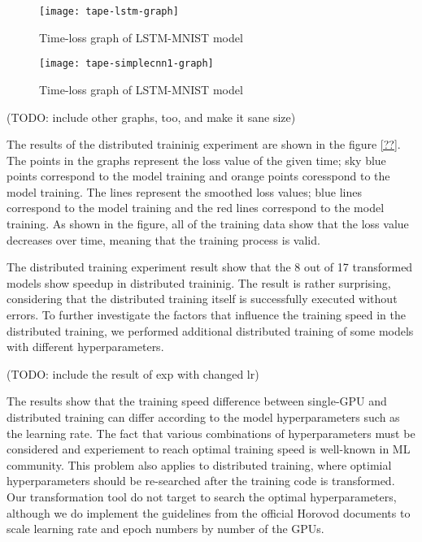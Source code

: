 \begin{figure}[!ht]
  \texttt{[image: tape-lstm-graph]}
  \caption{Time-loss graph of LSTM-MNIST model}
\end{figure}

\begin{figure}[!ht]
  \texttt{[image: tape-simplecnn1-graph]}
  \caption{Time-loss graph of LSTM-MNIST model}
\end{figure}

(TODO: include other graphs, too, and make it sane size)

The results of the distributed traininig experiment 
are shown in the figure \ref{??}.
The points in the graphs represent the loss value of the given time;
sky blue points correspond to the \orgbf model training and
orange points coresspond to the \hvdbf model training.
The lines represent the smoothed loss values;
blue lines correspond to the \orgbf model training
and the red lines correspond to the \hvdbf model training.
As shown in the figure, all of the training data show that
the loss value decreases over time, meaning that the training
process is valid.

The distributed training experiment result show that the 8 out of 17 transformed
models show speedup in distributed traininig. The result is rather surprising,
considering that the distributed training itself is successfully executed
without errors. To further investigate the factors that influence the
training speed in the distributed training, 
we performed additional distributed training of some models with
different hyperparameters.

(TODO: include the result of exp with changed lr)

The results show that the training speed difference between single-GPU and
distributed training can differ according to the model hyperparameters
such as the learning rate. The fact that various combinations of hyperparameters
must be considered and experiement to reach optimal training speed is 
well-known in ML community. This problem also applies to distributed training,
where optimial hyperparameters should be re-searched after the training
code is transformed. Our transformation tool do not target to search the 
optimal hyperparameters, although we do implement the guidelines from the
official Horovod documents to scale learning rate and epoch numbers
by number of the GPUs.  
